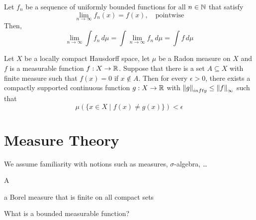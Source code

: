 \begin{theorem}
   Let $f_n$ be a sequence of uniformly bounded functions for all $n \in \mathbb{N}$
   that satisfy
   \begin{equation}
      \lim_{n\to\infty} f_n(x) = f(x), \quad \text{pointwise}
   \end{equation}
   Then, 
   \begin{equation}
      \lim_{n\to\infty}\int f_n \,d\mu = \int \lim_{n\to\infty} f_n \,d\mu = \int f \,d\mu
   \end{equation}
\end{theorem}

\begin{theorem}
   \label{thm:lusin}
   Let $X$ be a locally compact Hausdorff space, let $\mu$ be a Radon measure on
   $X$ and $f$ is a measurable function $f: X \to \mathbb{R}$. Suppose that there is a
   set $A \subseteq X$ with finite measure such that $f(x)=0$ if $x\not\in A$.
   Then for every $\epsilon >0$, there exists a compactly supported continuous
   function $g: X \to \mathbb{R}$ with $\left\| g \right\|_{infty} \leq \left\| f \right\|_{\infty}$ such that
   \begin{equation}
      \mu(\{ x\in X \mid f(x) \not= g(x) \}) < \epsilon
   \end{equation}
\end{theorem}

\section{Measure Theory}

We assume familiarity with notions such as measures, $\sigma$-algebra, \dots

\begin{definition}
   A 
\end{definition}

\begin{definition}
   a Borel measure that is finite on all compact sets   
\end{definition}

\begin{definition}
   
\end{definition}

What is a bounded measurable function?

\begin{definition}
   
\end{definition}

